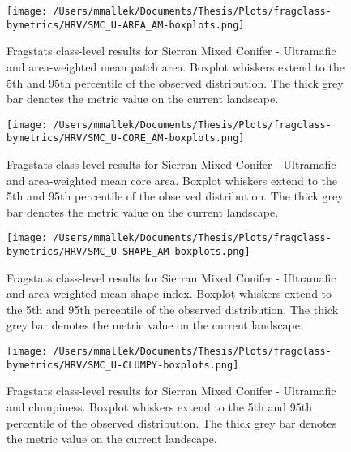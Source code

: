 \begin{figure}[!htbp]
\centering
    \texttt{[image: /Users/mmallek/Documents/Thesis/Plots/fragclass-bymetrics/HRV/SMC\_U-AREA\_AM-boxplots.png]}
  \caption{Fragstats class-level results for Sierran Mixed Conifer - Ultramafic and area-weighted mean patch area. Boxplot whiskers extend to the 5th and 95th percentile of the observed distribution. The thick grey bar denotes the metric value on the current landscape.}
  \label{fig:smcu_areaam}
\end{figure}


\begin{figure}[!htbp]
\centering
    \texttt{[image: /Users/mmallek/Documents/Thesis/Plots/fragclass-bymetrics/HRV/SMC\_U-CORE\_AM-boxplots.png]}
  \caption{Fragstats class-level results for Sierran Mixed Conifer - Ultramafic and area-weighted mean core area. Boxplot whiskers extend to the 5th and 95th percentile of the observed distribution. The thick grey bar denotes the metric value on the current landscape.}
  \label{fig:smcu_coream}
\end{figure}


\begin{figure}[!htbp]
\centering
    \texttt{[image: /Users/mmallek/Documents/Thesis/Plots/fragclass-bymetrics/HRV/SMC\_U-SHAPE\_AM-boxplots.png]}
  \caption{Fragstats class-level results for Sierran Mixed Conifer - Ultramafic and area-weighted mean shape index. Boxplot whiskers extend to the 5th and 95th percentile of the observed distribution. The thick grey bar denotes the metric value on the current landscape.}
  \label{fig:smcu_shapeam}
\end{figure}


\begin{figure}[!htbp]
\centering
    \texttt{[image: /Users/mmallek/Documents/Thesis/Plots/fragclass-bymetrics/HRV/SMC\_U-CLUMPY-boxplots.png]}
  \caption{Fragstats class-level results for Sierran Mixed Conifer - Ultramafic and clumpiness. Boxplot whiskers extend to the 5th and 95th percentile of the observed distribution. The thick grey bar denotes the metric value on the current landscape.}
  \label{fig:smcu_clumpy}
\end{figure}




